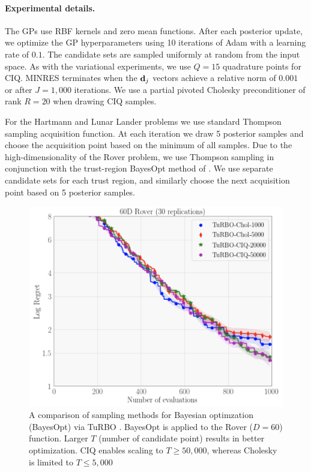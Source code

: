 \paragraph{Experimental details.}
The GPs use RBF kernels and zero mean functions.
After each posterior update, we optimize the GP hyperparameters using 10 iterations of Adam with a learning rate of $0.1$.
The candidate sets are sampled uniformly at random from the input space.
As with the variational experiments, we use $Q = 15$ quadrature points for CIQ.
MINRES terminates when the $\mathbf{d}_j$ vectors achieve a relative norm of $0.001$ or after $J=1,\!000$ iterations.
We use a partial pivoted Cholesky preconditioner of rank $R=20$ when drawing CIQ samples.

For the Hartmann and Lunar Lander problems we use standard Thompson sampling acquisition function.
At each iteration we draw 5 posterior samples and choose the acquisition point based on the minimum of all samples.
Due to the high-dimensionality of the Rover problem, we use Thompson sampling in conjunction with the trust-region BayesOpt method of \citet{eriksson2019scalable}.
We use separate candidate sets for each trust region, and similarly choose the next acquisition point based on 5 posterior samples.

\begin{figure}[t!]
  \centering
  \includegraphics[width=0.7\linewidth]{figures/rover.png}
  \caption[
    A comparison of sampling methods for Bayesian optimzation (BayesOpt) via TuRBO \cite{eriksson2019scalable}.
    BayesOpt is applied to the Rover ($D=60$) function.
  ]{
    A comparison of sampling methods for Bayesian optimzation (BayesOpt) via TuRBO \cite{eriksson2019scalable}.
    BayesOpt is applied to the Rover ($D=60$) function.
    Larger $T$ (number of candidate point) results in better optimization.
    CIQ enables scaling to $T\geq50,\!000$, whereas Cholesky is limited to $T\leq5,\!000$
  }
  \label{fig:rover}
\end{figure}

